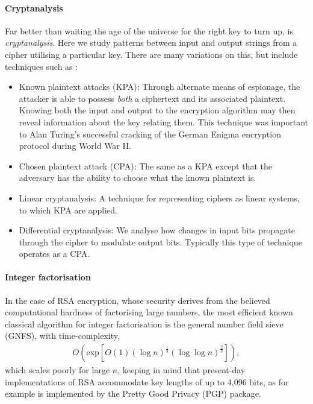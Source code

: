 %
%

\paragraph{Cryptanalysis}

Far better than waiting the age of the universe for the right key to turn up, is \textit{cryptanalysis}. Here we study patterns between input and output strings from a cipher utilising a particular key. There are many variations on this, but include techniques such as \cite{bib:Schneier96}:

\begin{itemize}
	\item Known plaintext attacks (KPA): Through alternate means of espionage, the attacker is able to possess \textit{both} a ciphertext and its associated plaintext. Knowing both the input and output to the encryption algorithm may then reveal information about the key relating them. This technique was important to Alan Turing's successful cracking of the German Enigma encryption protocol during World War II.
	\item Chosen plaintext attack (CPA): The same as a KPA except that the adversary has the ability to choose what the known plaintext is.
	\item Linear cryptanalysis: A technique for representing ciphers as linear systems, to which KPA are applied.
	\item Differential cryptanalysis: We analyse how changes in input bits propagate through the cipher to modulate output bits. Typically this type of technique operates as a CPA.
\end{itemize}
 
%
%
 
\paragraph{Integer factorisation}

In the case of RSA encryption, whose security derives from the believed computational hardness of factorising large numbers, the most efficient known classical algorithm for integer factorisation is the general number field sieve (GNFS), with time-complexity,
\begin{align} \label{eq:GNFS_scaling}
	O(\mathrm{exp}[O(1) (\log n)^{\frac{1}{3}} (\log\log n)^{\frac{2}{3}}]),
\end{align}
which scales poorly for large $n$, keeping in mind that present-day implementations of RSA accommodate key lengths of up to 4,096 bits, as for example is implemented by the Pretty Good Privacy (PGP) package.

